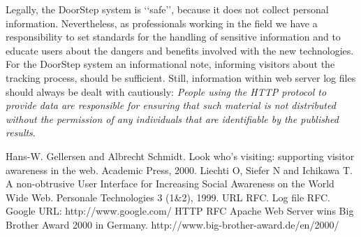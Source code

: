 \documentclass[a4paper]{danarticle}
\begin{document}
    Legally, the DoorStep system is \lq\lq safe\rq\rq , because it does not
    collect personal information. Nevertheless, as professionals working in the
    field we have a responsibility to set standards for the handling of sensitive
    information and to educate users about the dangers and benefits involved with
    the new technologies. For the DoorStep system an informational note,
    informing visitors about the tracking process, should be sufficient.
    Still, information within web server log files should always be dealt with
    cautiously: \textit{People using the HTTP protocol to provide data are
    responsible for ensuring that such material is not distributed without the
    permission of any individuals that are identifiable by the published
    results}. \cite{http}\cite[Apache web server wins Big Brother
    Award]{bigBro}
  \begin{thebibliography}{99}
     Hans-W. Gellersen and Albrecht Schmidt.
    Look who's visiting: supporting visitor awareness in the web.
    Academic Press, 2000.
     Liechti O, Siefer N and Ichikawa T.
    A non-obtrusive User Interface for Increasing Social Awareness on the 
    World Wide Web. Personale Technologies 3 (1\&2), 1999.
     URL RFC.
     Log file RFC.
     Google URL: http://www.google.com/
     HTTP RFC
     Apache Web Server wins Big Brother Award 2000 in Germany.
    http://www.big-brother-award.de/en/2000/
  \end{thebibliography}
\end{document}
